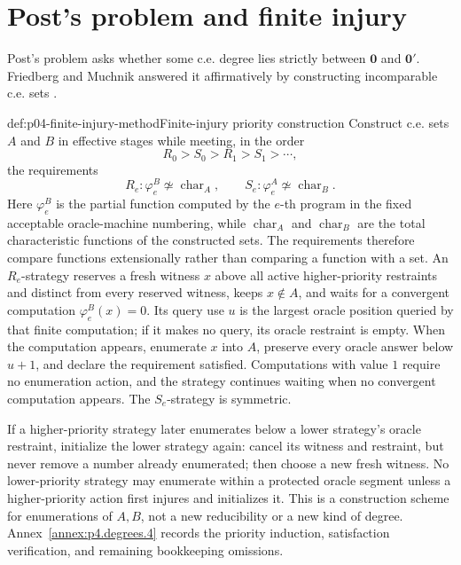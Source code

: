 \section{Post's problem and finite injury}
\label{sec:p04-finite-injury}

Post's problem asks whether some c.e. degree lies strictly between
\(\mathbf0\) and \(\mathbf0'\).  Friedberg and Muchnik answered it
affirmatively by constructing incomparable c.e. sets
\cite{Friedberg1957,Muchnik1956}.

\begin{hbmethod}{def:p04-finite-injury-method}{Finite-injury priority construction}
Construct c.e. sets \(A\) and \(B\) in effective stages while meeting, in the
order
\[
 R_0>S_0>R_1>S_1>\cdots,
\]
the requirements
\[
 R_e:\varphi_e^B\not\simeq\operatorname{char}_A,
 \qquad
 S_e:\varphi_e^A\not\simeq\operatorname{char}_B.
\]
Here \(\varphi_e^B\) is the partial function computed by the \(e\)-th
program in the fixed acceptable oracle-machine numbering, while
\(\operatorname{char}_A\) and \(\operatorname{char}_B\) are the total
characteristic functions of the constructed sets.  The requirements therefore
compare functions extensionally rather than comparing a function with a set.
An \(R_e\)-strategy reserves a fresh witness \(x\) above all active
higher-priority restraints and distinct from every reserved witness, keeps
\(x\notin A\), and waits for a convergent computation
\(\varphi_e^B(x)=0\).  Its query use \(u\) is the largest oracle position
queried by that finite computation; if it makes no query, its oracle restraint
is empty.  When the computation appears, enumerate \(x\) into \(A\), preserve
every oracle answer below \(u+1\), and declare the requirement satisfied.
Computations with value \(1\) require no enumeration action, and the strategy
continues waiting when no convergent computation appears.  The
\(S_e\)-strategy is symmetric.

If a higher-priority strategy later enumerates below a lower strategy's
oracle restraint, initialize the lower strategy again: cancel its witness and
restraint, but never remove a number already enumerated; then choose a new
fresh witness.  No lower-priority strategy may enumerate within a protected
oracle segment unless a higher-priority action first injures and initializes
it.  This is a construction scheme for enumerations of \(A,B\), not a new
reducibility or a new kind of degree.  Annex~\ref{annex:p4.degrees.4} records
the priority induction, satisfaction verification, and remaining bookkeeping
omissions.
\end{hbmethod}

